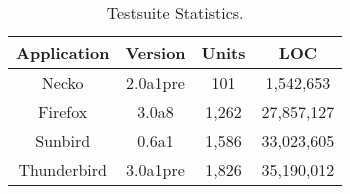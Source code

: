 {\protect
   \begin{table}[t]
   \centering
\normalsize
      \begin{tabular}{|c|c|c|c|}
         \hline
         {Application} & {Version} &  {Units}  & {LOC} \\
         \hline
         \hline
         {Necko} & {2.0a1pre} & {101}  & {1,542,653} \\
         \hline
         {Firefox} & {3.0a8} & {1,262} & {27,857,127} \\
         \hline
         {Sunbird} & {0.6a1} & {1,586} & {33,023,605} \\
         \hline
         {Thunderbird} & {3.0a1pre} & {1,826}  & {35,190,012} \\
         \hline
      \end{tabular}
      \caption {Testsuite Statistics. 
}
      \label{tab:mozillastats}
\shortline
   \end{table}
}

